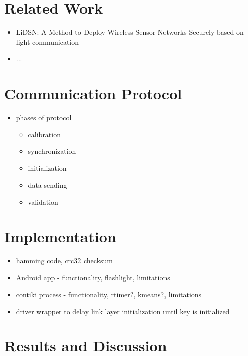 \documentclass{sig-alternate} %
\begin{document}
\section{Related Work}
\label{sec:related_work}

\begin{itemize}
	\item LiDSN: A Method to Deploy Wireless Sensor Networks Securely based on light communication
	\item ...
\end{itemize}


\section{Communication Protocol}
\label{sec:communication_protocol}

\begin{itemize}
	\item phases of protocol
	\begin{itemize}
		\item calibration
		\item synchronization
		\item initialization
		\item data sending
		\item validation
	\end{itemize}
\end{itemize}



\section{Implementation}
\label{sec:contiki_integration}

\begin{itemize}
	\item hamming code, crc32 checksum
	\item Android app - functionality, flashlight, limitations
	\item contiki process - functionality, rtimer?, kmeans?, limitations
	\item driver wrapper to delay link layer initialization until key is initialized
\end{itemize}



\section{Results and Discussion}
\label{sec:results_and_discussion}
\end{document}

